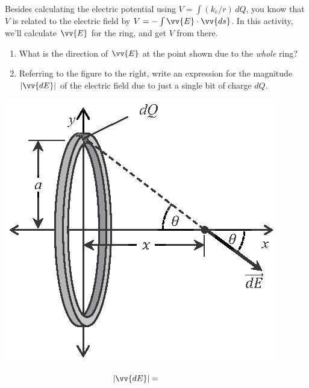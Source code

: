 \begin{minipage}{0.60\textwidth}
Besides calculating the electric potential using $V=\int{({k_e/r})\,dQ}$, you know that $V$ is related to the electric field by $V=-\int{\vv{E} \cdot \vv{ds}}$.  In this activity, we'll calculate $\vv{E}$ for the ring, and get $V$ from there.

\begin{enumerate}[wide, label=(\emph{\alph*})]

\item What is the direction of $\vv{E}$ at the point shown due to the \textit{whole} ring?
\answerspace{0.3in}

\item Referring to the figure to the right, write an expression for the magnitude $| \vv{dE} |$ of the electric field due to just a single bit of charge $dQ$.

\end{enumerate}
\end{minipage}
\begin{minipage}{0.39\textwidth}
\vspace{-0.3in}
\raggedleft \includegraphics[scale=1.0]{potential_charge_distributions/ring_E_field.eps}
\end{minipage}
$$| \vv{dE}|=\hspace{0.7in}$$
\answerspace{0.1in}

